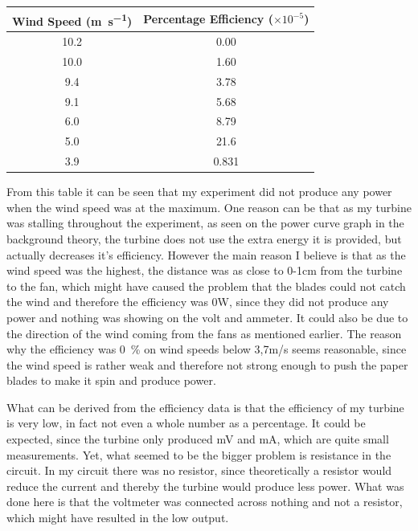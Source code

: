 \documentclass[12pt]{article}
\begin{document}
\begin{table}[h]
\centering
\begin{tabular}{@{}cc@{}} \toprule
Wind Speed (\si{\metre\per\second}) & Percentage Efficiency ($\times 10^{-5}$) \\ \midrule
10.2 & 0.00 \\ 
10.0 & 1.60 \\ 
9.4  & 3.78 \\ 
9.1  & 5.68 \\ 
6.0  & 8.79 \\ 
5.0  & 21.6 \\ 
3.9  & 0.831 \\ \bottomrule
\end{tabular}
\end{table}

From this table it can be seen that my experiment did not produce any power when the wind speed was at the maximum.
One reason can be that as my turbine was stalling throughout the experiment, as seen on the power curve graph in the background theory, the turbine does not use the extra energy it is provided, but actually decreases it's efficiency.
However the main reason I believe is that as the wind speed was the highest, the distance was as close to 0-1cm from the turbine to the fan, which might have caused the problem that the blades could not catch the wind and therefore the efficiency was 0W, since they did not produce any power and nothing was showing on the volt and ammeter.
It could also be due to the direction of the wind coming from the fans as mentioned earlier.
The reason why the efficiency was \SI{0}{\percent} on wind speeds below 3,7m/s seems reasonable, since the wind speed is rather weak and therefore not strong enough to push the paper blades to make it spin and produce power.


What can be derived from the efficiency data is that the efficiency of my turbine is very low, in fact not even a whole number as a percentage.
It could be expected, since the turbine only produced mV and mA, which are quite small measurements.
Yet, what seemed to be the bigger problem is resistance in the circuit.
In my circuit there was no resistor, since theoretically a resistor would reduce the current and thereby the turbine would produce less power.
What was done here is that the voltmeter was connected across nothing and not a resistor, which might have resulted in the low output.
\end{document}

